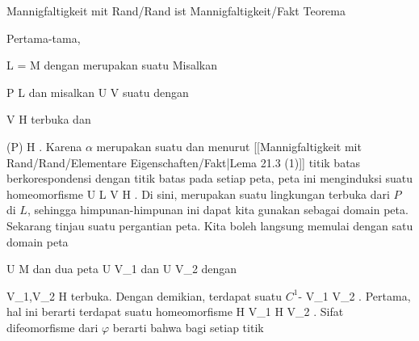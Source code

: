 {Mannigfaltigkeit mit Rand/Rand ist Mannigfaltigkeit/Fakt}
{Teorema}
{}
{

\faktzusatz {}
\faktzusatz {}

}
{

Pertama-tama,

\mavergleichskette
{\vergleichskette
{ L
}
{ = }{ \partial M
}
{  }{
}
{    }{
}
{   }{
}
}
{}{}{}
dengan
merupakan suatu
Misalkan

\mavergleichskette
{\vergleichskette
{ P
}
{ \in }{ L
}
{  }{
}
{    }{
}
{   }{
}
}
{}{}{}
dan misalkan
\maabbdisp {\alpha} { U } { V
} {}
suatu
dengan

\mavergleichskette
{\vergleichskette
{ V
}
{ \subseteq }{ H
}
{  }{
}
{    }{
}
{   }{
}
}
{}{}{}
terbuka dan

\mavergleichskette
{\vergleichskette
{ \alpha(P)
}
{ \in }{ \partial H
}
{  }{
}
{    }{
}
{   }{
}
}
{}{}{.}
Karena $\alpha$ merupakan suatu
dan menurut
[[Mannigfaltigkeit mit Rand/Rand/Elementare Eigenschaften/Fakt|Lema 21.3 (1)]]
titik batas berkorespondensi dengan titik batas pada setiap peta, peta ini menginduksi suatu homeomorfisme
\maabbdisp {} {U \cap L} {V \cap \partial H
} {.}
Di sini,
 merupakan suatu lingkungan terbuka dari $P$ di $L$, sehingga himpunan-himpunan ini dapat kita gunakan sebagai domain peta. Sekarang tinjau suatu pergantian peta. Kita boleh langsung memulai dengan satu domain peta

\mavergleichskette
{\vergleichskette
{ U
}
{ \subseteq }{ M
}
{  }{
}
{    }{
}
{   }{
}
}
{}{}{}
dan dua peta
 { U } { V_1
} {} dan  { U } { V_2
} {}
dengan

\mavergleichskette
{\vergleichskette
{ V_1,V_2
}
{ \subseteq }{ H
}
{  }{
}
{    }{
}
{   }{
}
}
{}{}{}
terbuka. Dengan demikian, terdapat suatu
$C^1$-
 {V_1 } { V_2
} {.}
Pertama, hal ini berarti terdapat suatu homeomorfisme
\maabb {} { \partial H \cap V_1 } { \partial H \cap V_2
} {.}
Sifat difeomorfisme dari $\varphi$ berarti bahwa bagi setiap titik

}
